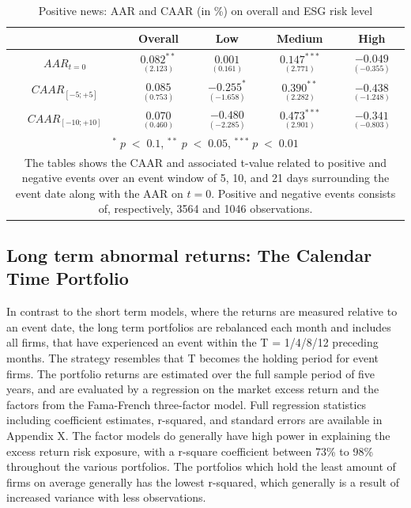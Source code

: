 \begin{table}[H]
\centering
\caption{Positive news: AAR and CAAR (in \%) on overall and ESG risk level} 
\begin{tabular}{ccccc}
  \hline  \hline
  & \multicolumn{1}{c}{Overall} &  \multicolumn{1}{c}{Low} & \multicolumn{1}{c}{Medium} & \multicolumn{1}{c}{High}\\  
 \hline
$AAR_{t=0}$ &  $\underset{(2.123)}{0.082^{**}}$ & $\underset{(0.161)}{0.001}$ & $\underset{(2.771)}{0.147^{***}}$ &  $\underset{(-0.355)}{-0.049}$ \\ 
$CAAR_{[-5;+5]}$  & $\underset{(0.753)}{0.085}$ &  $\underset{(-1.658)}{-0.255^{*}}$ &  $\underset{(2.282)}{0.390^{**}}$ &  $\underset{(-1.248)}{-0.438}$ \\ 
$CAAR_{[-10;+10]}$    & $\underset{(0.460)}{0.070}$ &  $\underset{(-2.285)}{-0.480}$ &  $\underset{(2.901)}{0.473^{***}}$ &  $\underset{(-0.803)}{-0.341}$ \\ 
    \hline \hline
   \multicolumn{5}{p{10cm}}{ \footnotesize $^* \; p\; <\; 0.1$, $ ^{**} \; p\; <\; 0.05$, $ ^{***} \; p\; <\; 0.01$  } \\
   \multicolumn{5}{p{10cm}}{\footnotesize The tables shows the CAAR and associated t-value related to positive and negative events over an event window of 5, 10, and 21 days surrounding the event date along with the AAR on $t=0$. Positive and negative events consists of, respectively, 3564 and 1046 observations. } \\
   \hline
\end{tabular}
\label{tab: ST_pos_significance}
\end{table}




\subsection{Long term abnormal returns: The Calendar Time Portfolio} \label{sec: long_term_portfolio}

In contrast to the short term models, where the returns are measured relative to an event date, the long term portfolios are rebalanced each month and includes all firms, that have experienced an event within the T = 1/4/8/12 preceding months. The strategy resembles that T becomes the holding period for event firms. The portfolio returns are estimated over the full sample period of five years, and are evaluated by a regression on the market excess return and the factors from the Fama-French \citeyear{Fama_french_3fac} three-factor model. Full regression statistics including coefficient estimates, r-squared, and standard errors are available in Appendix X. The factor models do generally have high power in explaining the excess return risk exposure, with a r-square coefficient between 73\% to 98\% throughout the various portfolios. The portfolios which hold the least amount of firms on average generally has the lowest r-squared, which generally is a result of increased variance with less observations.  


